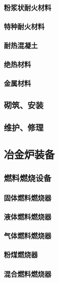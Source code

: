 \documentclass[UTF8]{../../ApplicationUniverse}
\begin{document}
            \paragraph{粉浆状耐火材料}
            \paragraph{特种耐火材料}
            \paragraph{耐热混凝土}
            \paragraph{绝热材料}
            \paragraph{金属材料}
        \subsubsection{砌筑、安装}
        \subsubsection{维护、修理}
    \subsection{冶金炉装备}
        \subsubsection{燃料燃烧设备}
            \paragraph{固体燃料燃烧器}
            \paragraph{液体燃料燃烧器}
            \paragraph{气体燃料燃烧器}
            \paragraph{粉煤燃烧器}
            \paragraph{混合燃料燃烧器}
\end{document}

